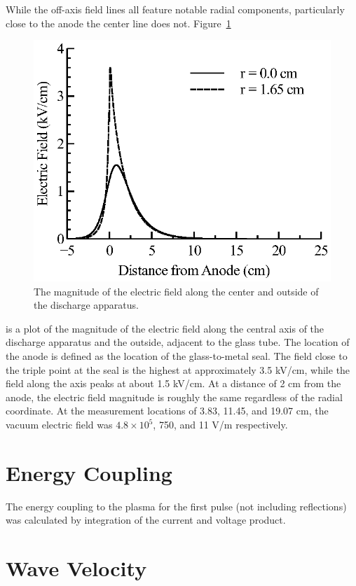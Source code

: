 While the off-axis field lines all feature notable radial components,
particularly close to the anode the center line does not.
Figure~\ref{fig:centere}
\begin{figure}
  \centering
  \includegraphics{./chapters/experiment/figures/centere.eps}
  \caption{The magnitude of the electric field along the center and outside of
  the discharge apparatus.}
  \label{fig:centere}
\end{figure}
is a plot of the magnitude of the electric field along the central axis of the
discharge apparatus and the outside, adjacent to the glass tube. The location of
the anode is defined as the location of the glass-to-metal seal. The field close
to the triple point at the seal is the highest at approximately 3.5 kV/cm, while
the field along the axis peaks at about 1.5 kV/cm. At a distance of 2 cm from
the anode, the electric field magnitude is roughly the same regardless of the
radial coordinate. At the measurement locations of 3.83, 11.45, and 19.07 cm,
the vacuum electric field was $4.8 \times 10^5$, 750, and 11 V/m respectively. 

\section{Energy Coupling}

The energy coupling to the plasma for the first pulse (not including
reflections) was calculated by integration of the current and voltage product. 

\section{Wave Velocity}

